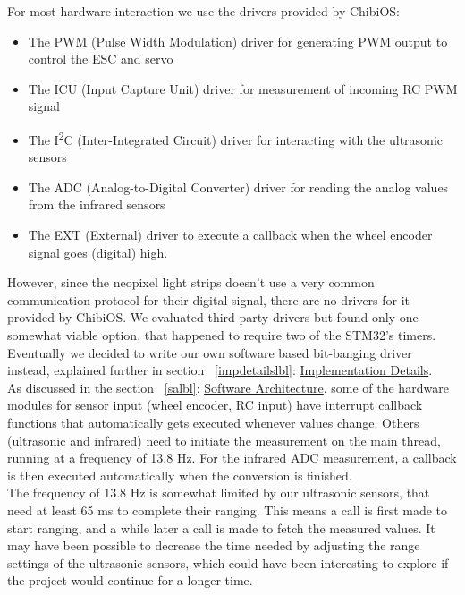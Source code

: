 \noindent
For most hardware interaction we use the drivers provided by ChibiOS:
\begin{itemize}
   \item The PWM (Pulse Width Modulation) driver for generating PWM output to
       control the ESC and servo
   \item The ICU (Input Capture Unit) driver for measurement of incoming RC PWM
       signal
   \item The I\textsuperscript{2}C (Inter-Integrated Circuit) driver for
       interacting with the ultrasonic sensors
   \item The ADC (Analog-to-Digital Converter) driver for reading the analog
       values from the infrared sensors
   \item The EXT (External) driver to execute a callback when the wheel encoder
       signal goes (digital) high.
\end{itemize}
However, since the neopixel light strips doesn’t use a very common communication
protocol for their digital signal, there are no drivers for it provided by
ChibiOS. We evaluated third-party drivers but found only one somewhat viable
option, that happened to require two of the STM32’s timers. Eventually we
decided to write our own software based bit-banging driver instead, explained
further in section ~\ref{impdetailslbl}: \hyperlink{impdetailstgt}
{Implementation Details}.\\

\noindent
As discussed in the section ~\ref{salbl}: \hyperlink{satgt}
{Software Architecture}, some of the hardware modules for sensor input (wheel
encoder, RC input) have interrupt callback functions that automatically gets
executed whenever values change. Others (ultrasonic and infrared) need to
initiate the measurement on the main thread, running at a frequency of 13.8 Hz.
For the infrared ADC measurement, a callback is then executed automatically when
the conversion is finished.\\

\noindent
The frequency of 13.8 Hz is somewhat limited by our ultrasonic sensors, that
need at least 65 ms to complete their ranging. This means a call is first made
to start ranging, and a while later a call is made to fetch the measured values.
It may have been possible to decrease the time needed by adjusting the range
settings of the ultrasonic sensors, which could have been interesting to explore
if the project would continue for a longer time.\\

